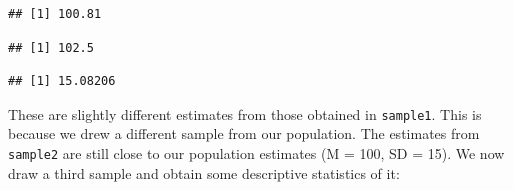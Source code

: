 \documentclass[
]{book}
\newenvironment{Shaded}{\begin{snugshade}}{\end{snugshade}}
\newcommand{\AttributeTok}[1]{\textcolor[rgb]{0.77,0.63,0.00}{#1}}
\newcommand{\CommentTok}[1]{\textcolor[rgb]{0.56,0.35,0.01}{\textit{#1}}}
\newcommand{\DecValTok}[1]{\textcolor[rgb]{0.00,0.00,0.81}{#1}}
\newcommand{\FunctionTok}[1]{\textcolor[rgb]{0.00,0.00,0.00}{#1}}
\newcommand{\NormalTok}[1]{#1}
\newcommand{\OtherTok}[1]{\textcolor[rgb]{0.56,0.35,0.01}{#1}}
\newcommand{\SpecialCharTok}[1]{\textcolor[rgb]{0.00,0.00,0.00}{#1}}
\begin{document}
\begin{Shaded}
\end{Shaded}

\begin{verbatim}
## [1] 100.81
\end{verbatim}

\begin{Shaded}
\end{Shaded}

\begin{verbatim}
## [1] 102.5
\end{verbatim}

\begin{Shaded}
\end{Shaded}

\begin{verbatim}
## [1] 15.08206
\end{verbatim}

These are slightly different estimates from those obtained in \texttt{sample1}. This is because we drew a different sample from our population. The estimates from \texttt{sample2} are still close to our population estimates (M = 100, SD = 15). We now draw a third sample and obtain some descriptive statistics of it:

\begin{Shaded}
\end{Shaded}
\end{document}

